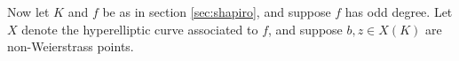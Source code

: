 \documentclass[11pt]{amsart}
\def\F{\mathbb F}
\theoremstyle{plain}
\theoremstyle{definition}
\newcommand{\AJ}{\mathrm{AJ}}
\newcommand{\sep}{\mathrm{sep}}
\newcommand{\et}{\mathrm{\acute{e}t}}
\newcommand{\Ker}{\mathrm{Ker}}
\begin{document}
Now let $K$ and $f$ be as in section \ref{sec:shapiro}, and suppose $f$ has odd degree. Let $X$ denote the hyperelliptic curve associated to $f$, and suppose $b,z\in X(K)$ are non-Weierstrass points. 
\end{document}
